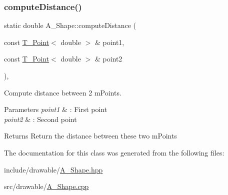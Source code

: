 \subsubsection{\texorpdfstring{compute\+Distance()}{computeDistance()}}
{\footnotesize\ttfamily static double A\+\_\+\+Shape\+::compute\+Distance (\begin{DoxyParamCaption}\item[{const \hyperlink{classT__Point}{T\+\_\+\+Point}$<$ double $>$ \&}]{point1,  }\item[{const \hyperlink{classT__Point}{T\+\_\+\+Point}$<$ double $>$ \&}]{point2 }\end{DoxyParamCaption})\hspace{0.3cm}{\ttfamily [inline]}, {\ttfamily [static]}}



Compute distance between 2 m\+Points. 


\begin{DoxyParams}{Parameters}
{\em point1} & \+: First point \\
\hline
{\em point2} & \+: Second point \\
\hline
\end{DoxyParams}
\begin{DoxyReturn}{Returns}
Return the distance between these two m\+Points 
\end{DoxyReturn}


The documentation for this class was generated from the following files\+:\begin{DoxyCompactItemize}
\item 
include/drawable/\hyperlink{A__Shape_8hpp}{A\+\_\+\+Shape.\+hpp}\item 
src/drawable/\hyperlink{A__Shape_8cpp}{A\+\_\+\+Shape.\+cpp}\end{DoxyCompactItemize}
